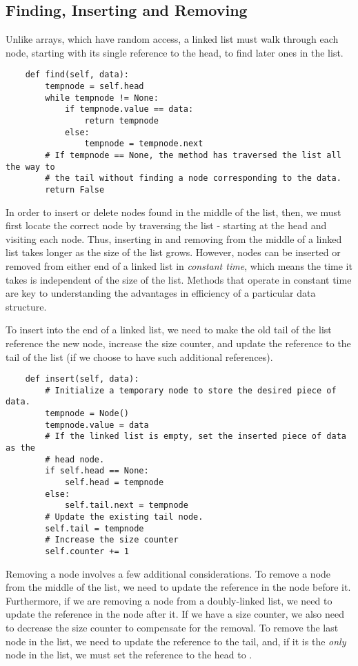 \subsection*{Finding, Inserting and Removing}
Unlike arrays, which have random access, a linked list must walk through each node, starting with its single reference to the head, to find later ones in the list.
\begin{lstlisting}
    def find(self, data):
        tempnode = self.head
        while tempnode != None:
            if tempnode.value == data:
                return tempnode
            else:
                tempnode = tempnode.next
        # If tempnode == None, the method has traversed the list all the way to
        # the tail without finding a node corresponding to the data.
        return False
\end{lstlisting}

In order to insert or delete nodes found in the middle of the list, then, we must first locate the correct node by traversing the list - starting at the head and visiting each node.
Thus, inserting in and removing from the middle of a linked list takes longer as the size of the list grows.
However, nodes can be inserted or removed from either end of a linked list in \emph{constant time}, which means the time it takes is independent of the size of the list.
Methods that operate in constant time are key to understanding the advantages in efficiency of a particular data structure.

To insert into the end of a linked list, we need to make the old tail of the list reference the new node, increase the size counter, and update the reference to the tail of the list (if we choose to have such additional references).

\begin{lstlisting}
    def insert(self, data):
        # Initialize a temporary node to store the desired piece of data.
        tempnode = Node()
        tempnode.value = data
        # If the linked list is empty, set the inserted piece of data as the
        # head node.
        if self.head == None:
            self.head = tempnode
        else:
            self.tail.next = tempnode
        # Update the existing tail node.
        self.tail = tempnode
        # Increase the size counter
        self.counter += 1
\end{lstlisting}

Removing a node involves a few additional considerations.
To remove a node from the middle of the list, we need to update the  reference in the node before it.
Furthermore, if we are removing a node from a doubly-linked list, we need to update the  reference in the node after it.
If we have a size counter, we also need to decrease the size counter to compensate for the removal.
To remove the last node in the list, we need to update the reference to the tail, and, if it is the \emph{only} node in the list, we must set the reference to the head to .

